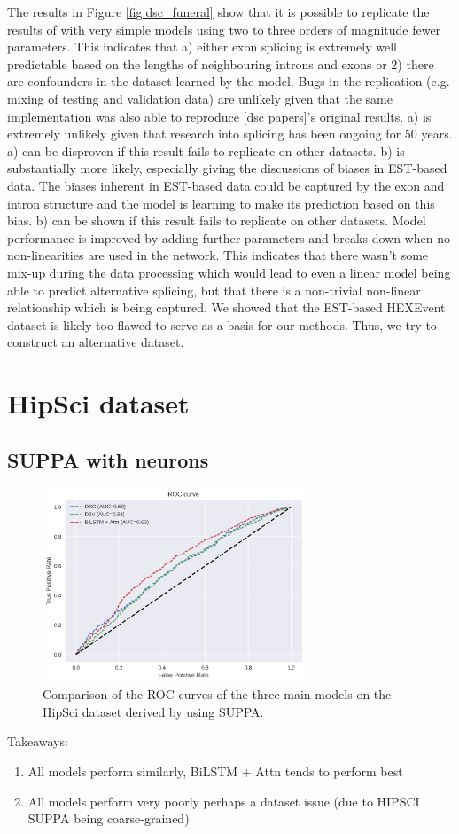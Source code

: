 The results in Figure \ref{fig:dsc_funeral} show that it is possible to replicate the results of \cite{dsc} with very simple models using two to three orders of magnitude fewer parameters. This indicates that a) either exon splicing is extremely well predictable based on the lengths of neighbouring introns and exons or 2) there are confounders in the dataset learned by the model.
Bugs in the replication (e.g. mixing of testing and validation data) are unlikely given that the same implementation was also able to reproduce [dsc papers]'s original results.
a) is extremely unlikely given that research into splicing has been ongoing for 50 years. a) can be disproven if this result fails to replicate on other datasets.
b) is substantially more likely, especially giving the discussions of biases in EST-based data. The biases inherent in EST-based data could be captured by the exon and intron structure and the model is learning to make its prediction based on this bias. b) can be shown if this result fails to replicate on other datasets. Model performance is improved by adding further parameters and breaks down when no non-linearities are used in the network. This indicates that there wasn't some mix-up during the data processing which would lead to even a linear model being able to predict alternative splicing, but that there is a non-trivial non-linear relationship which is being captured.
We showed that the EST-based HEXEvent dataset is likely too flawed to serve as a basis for our methods. Thus, we try to construct an alternative dataset.


\section{HipSci dataset}
\subsection{SUPPA with neurons}

\begin{figure}
	\centering\includegraphics[width=0.7\textwidth]{../visualizations/suppa_cross_model_roc_auc_comparison.png} 
	\caption[bla.]{Comparison of the ROC curves of the three main models on the HipSci dataset derived by using SUPPA. }
	\label{fig:suppa_auc}
\end{figure}

Takeaways:
\begin{enumerate}
	\item All models perform similarly, BiLSTM + Attn tends to perform best
	\item All models perform very poorly perhaps a dataset issue (due to HIPSCI SUPPA being coarse-grained)
\end{enumerate}
